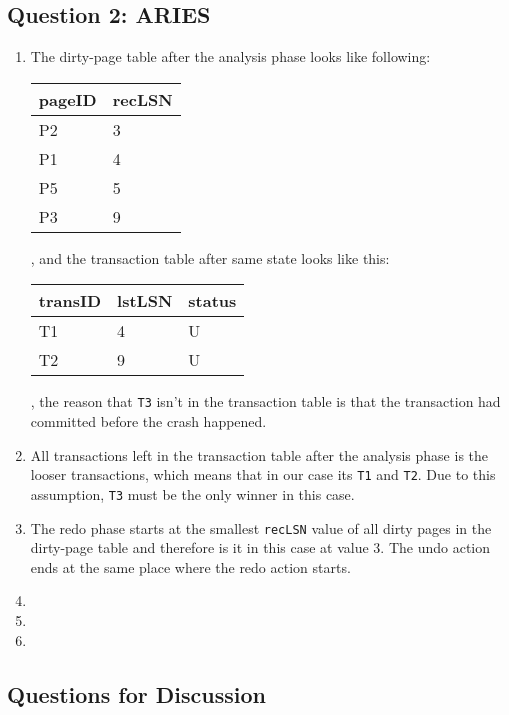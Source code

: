 \documentclass[10pt,a4paper]{article}
\begin{document}
\subsection*{Question 2: ARIES}
\begin{enumerate}
	\item The dirty-page table after the analysis phase looks like following:
		\begin{center}
		\begin{tabular}{|l|l|}
			\hline
			\textbf{pageID} & \textbf{recLSN} \\ \hline
			P2 & 3 \\ \hline
			P1 & 4 \\ \hline
			P5 & 5 \\ \hline
			P3 & 9 \\ \hline
		\end{tabular}
		\end{center}
		, and the transaction table after same state looks like this:
		\begin{center}
		\begin{tabular}{|l|l|l|}
			\hline
			\textbf{transID} & \textbf{lstLSN} & \textbf{status} \\ \hline
			T1 & 4 & U \\ \hline
			T2 & 9 & U \\ \hline
		\end{tabular}
		\end{center}
		, the reason that \texttt{T3} isn't in the transaction table is that the transaction had committed before the crash happened.
	\item All transactions left in the transaction table after the analysis phase is the looser transactions, which means that in our case its \texttt{T1} and \texttt{T2}. Due to this assumption, \texttt{T3} must be the only winner in this case.
	\item The redo phase starts at the smallest \texttt{recLSN} value of all dirty pages in the dirty-page table and therefore is it in this case at value 3. The undo action ends at the same place where the redo action starts. 
	\item
	\item
	\item
\end{enumerate}

\subsection*{Questions for Discussion}
\end{document}
